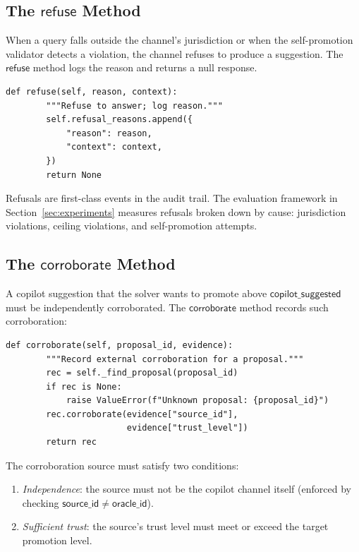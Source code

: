 \documentclass[11pt]{article}
\newcommand{\copilottrust}{$\mathsf{copilot\_suggested}$}
\begin{document}
\subsection{The \texorpdfstring{$\mathsf{refuse}$}{refuse} Method}
\label{sec:refuse}

When a query falls outside the channel's jurisdiction or when the
self-promotion validator detects a violation, the channel refuses
to produce a suggestion.  The $\mathsf{refuse}$ method logs the
reason and returns a null response.

\begin{lstlisting}[style=jugeo-python,caption={Refusal logic.}]
    def refuse(self, reason, context):
        """Refuse to answer; log reason."""
        self.refusal_reasons.append({
            "reason": reason,
            "context": context,
        })
        return None
\end{lstlisting}

Refusals are first-class events in the audit trail.  The
evaluation framework in Section~\ref{sec:experiments} measures
refusals broken down by cause: jurisdiction violations, ceiling
violations, and self-promotion attempts.

\subsection{The \texorpdfstring{$\mathsf{corroborate}$}{corroborate}
  Method}\label{sec:corroborate}

A copilot suggestion that the solver wants to promote above
\copilottrust{} must be independently corroborated.  The
$\mathsf{corroborate}$ method records such corroboration:

\begin{lstlisting}[style=jugeo-python,caption={Corroboration protocol.}]
    def corroborate(self, proposal_id, evidence):
        """Record external corroboration for a proposal."""
        rec = self._find_proposal(proposal_id)
        if rec is None:
            raise ValueError(f"Unknown proposal: {proposal_id}")
        rec.corroborate(evidence["source_id"],
                        evidence["trust_level"])
        return rec
\end{lstlisting}

The corroboration source must satisfy two conditions:
\begin{enumerate}
  \item \emph{Independence}: the source must not be the copilot
    channel itself (enforced by checking
    $\mathsf{source\_id} \ne \mathsf{oracle\_id}$).
  \item \emph{Sufficient trust}: the source's trust level must
    meet or exceed the target promotion level.
\end{enumerate}
\end{document}
